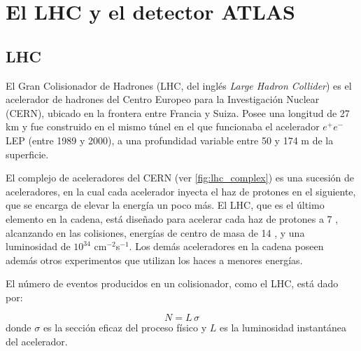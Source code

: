 \chapter{El LHC y el detector ATLAS}
\label{cap:detector}






\section{LHC}

El Gran Colisionador de Hadrones (LHC, del inglés \emph{Large Hadron Collider})
\cite{Evans:1129806} es el acelerador de hadrones del Centro Europeo para la
Investigación Nuclear (CERN), ubicado en la frontera entre Francia y Suiza.
Posee una longitud de 27 km y fue construido en el mismo túnel en el que
funcionaba el acelerador $e^{+}e^{-}$ LEP \cite{LEP} (entre 1989 y 2000), a una
profundidad variable entre 50 y 174 m de la superficie.

El complejo de aceleradores del CERN (ver \cref{fig:lhc_complex}) es una
sucesión de aceleradores, en la cual cada acelerador inyecta el haz de protones
en el siguiente, que se encarga de elevar la energía un poco más. El LHC, que es
el último elemento en la cadena, está diseñado para acelerar cada haz de
protones a 7 \tev, alcanzando en las colisiones, energías de centro de masa de
14 \tev, y una luminosidad de $10^{34}$ cm$^{-2}$s$^{-1}$. Los demás
aceleradores en la cadena poseen además otros experimentos que utilizan los
haces a menores energías.

El número de eventos producidos en un colisionador, como el LHC, está dado
por:

\begin{equation}
  N = L \, \sigma
\end{equation}
%
donde $\sigma$ es la sección eficaz del proceso físico y $L$ es la luminosidad instantánea del
acelerador.


